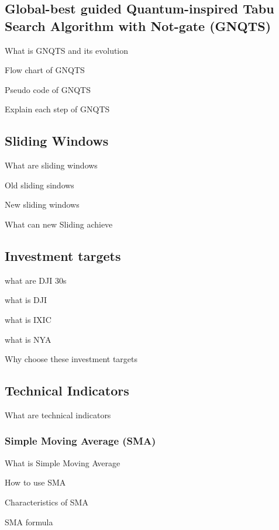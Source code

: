\documentclass[../main.tex]{subfiles}
\begin{document}
\subsection{Global-best guided Quantum-inspired Tabu Search Algorithm with Not-gate (GNQTS)}
What is GNQTS and its evolution

Flow chart of GNQTS

Pseudo code of GNQTS

Explain each step of GNQTS

\subsection{Sliding Windows}
What are sliding windows

Old sliding sindows

New sliding windows

What can new Sliding achieve

\subsection{Investment targets}
what are DJI 30s

what is DJI

what is IXIC

what is NYA

Why choose these investment targets

\subsection{Technical Indicators}
What are technical indicators

\subsubsection{Simple Moving Average (SMA)}
What is Simple Moving Average

How to use SMA

Characteristics of SMA

SMA formula
\end{document}
